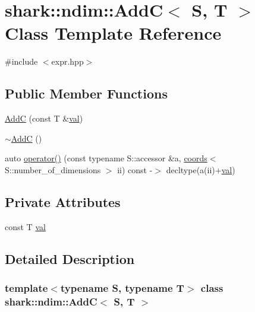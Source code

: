 \hypertarget{classshark_1_1ndim_1_1_add_c}{}\section{shark\+:\+:ndim\+:\+:AddC$<$ S, T $>$ Class Template Reference}
\label{classshark_1_1ndim_1_1_add_c}


{\ttfamily \#include $<$expr.\+hpp$>$}

\subsection*{Public Member Functions}
\begin{DoxyCompactItemize}
\item 
\hyperlink{classshark_1_1ndim_1_1_add_c_a5044afde60f2b80178594c82e2bcc107}{AddC} (const T \&\hyperlink{classshark_1_1ndim_1_1_add_c_a30bcb1ec409e0b53c65adec49eb2af81}{val})
\item 
\hyperlink{classshark_1_1ndim_1_1_add_c_acab0d95354a5bb1835f9e68e60899749}{$\sim$\+AddC} ()
\item 
auto \hyperlink{classshark_1_1ndim_1_1_add_c_a2bd9d0064119ef2b4cb1bebce43dca3c}{operator()} (const typename S\+::accessor \&a, \hyperlink{structshark_1_1ndim_1_1coords}{coords}$<$ S\+::number\+\_\+of\+\_\+dimensions $>$ ii) const -\/$>$ decltype(a(ii)+\hyperlink{classshark_1_1ndim_1_1_add_c_a30bcb1ec409e0b53c65adec49eb2af81}{val})
\end{DoxyCompactItemize}
\subsection*{Private Attributes}
\begin{DoxyCompactItemize}
\item 
const T \hyperlink{classshark_1_1ndim_1_1_add_c_a30bcb1ec409e0b53c65adec49eb2af81}{val}
\end{DoxyCompactItemize}


\subsection{Detailed Description}
\subsubsection*{template$<$typename S, typename T$>$\newline
class shark\+::ndim\+::\+Add\+C$<$ S, T $>$}

